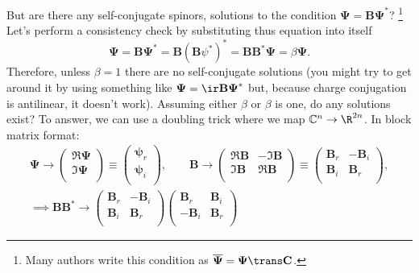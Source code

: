 \documentclass[11pt]{article}
\newcommand{\B}{\mathbf{B}}
\renewcommand{\C}{\mathbf{C}}
\newcommand{\Cb}{\mathbb{C}}
\newcommand{\psib}{\boldsymbol{\psi}}
\newcommand{\Psib}{\boldsymbol{\Psi}}
\begin{document}
But are there any self-conjugate spinors, \ie solutions to the condition \( \Psib = \B \Psib^\ast \)?%
\footnote{Many authors write this condition as \( \overline{\Psib} = \Psib\trans \C \).}
Let's perform a consistency  check by substituting thus equation into itself
%
\begin{equation*}
  \Psib = \B \Psib^\ast = \B (\B \psi^\ast)^\ast = \B \B^\ast \Psib = \beta \Psib.
\end{equation*}
%
Therefore, unless $\beta = 1$ there are no self-conjugate solutions
(you might try to get around it by using something like \( \Psib = \ir \B \Psib^\ast \) but, because charge conjugation is antilinear, it doesn't work).
Assuming either $\beta$ or $\beta$ is one, do any solutions exist?
To answer, we can use a doubling trick where we map $\Cb^n \to \R^{2n}$.
In block matrix format:
%
\begin{equation*}
\begin{gathered}
  \Psib \to \begin{pmatrix}
              \Re \Psib \\
              \Im \Psib \\
            \end{pmatrix}
  \equiv    \begin{pmatrix}
              \psib_r \\
              \psib_i \\
            \end{pmatrix}
  , \qquad
  \B \to \begin{pmatrix}
           \Re \B & -\Im \B \\
           \Im \B &  \Re \B \\
         \end{pmatrix}
  \equiv \begin{pmatrix}
           \B_r & -\B_i \\
           \B_i &  \B_r \\
         \end{pmatrix}
  , \\
  \implies
  \B \B^\ast \to
         \begin{pmatrix}
           \B_r & -\B_i \\
           \B_i &  \B_r \\
         \end{pmatrix}
         \begin{pmatrix}
            \B_r & \B_i \\
           -\B_i & \B_r \\

\end{pmatrix}
\end{gathered}
\end{equation*}
\end{document}

